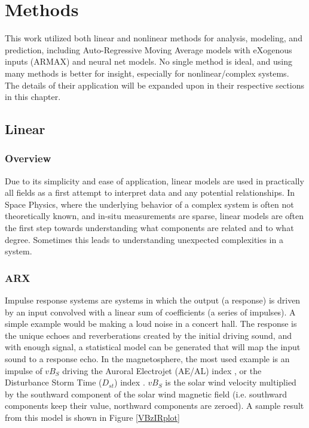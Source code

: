 \chapter[Models]{Methods}

This work utilized both linear and nonlinear methods for analysis, modeling, and prediction, including Auto-Regressive Moving Average models with eXogenous inputs (ARMAX) and neural net models. No single method is ideal, and using many methods is better for insight, especially for nonlinear/complex systems. The details of their application will be expanded upon in their respective sections in this chapter.

\section{Linear}

\subsection{Overview}
Due to its simplicity and ease of application, linear models are used in practically all fields as a first attempt to interpret data and any potential relationships. In Space Physics, where the underlying behavior of a complex system is often not theoretically known, and in-situ measurements are sparse, linear models are often the first step towards understanding what components are related and to what degree. Sometimes this leads to understanding unexpected complexities in a system.


\subsection{ARX}

Impulse response systems are systems in which the output (a response) is driven by an input convolved with a linear sum of coefficients (a series of impulses). A simple example would be making a loud noise in a concert hall. The response is the unique echoes and reverberations created by the initial driving sound, and with enough signal, a statistical model can be generated that will map the input sound to a response echo. In the magnetosphere, the most used example is an impulse of $vB_S$ driving the Auroral Electrojet (AE/AL) index \citep{VBzAL}, or the Disturbance Storm Time ($D_{st}$) index \citep{VBzDST}. $vB_S$ is the solar wind velocity multiplied by the southward component of the solar wind magnetic field (i.e. southward components keep their value, northward components are zeroed). A sample result from this model is  shown in Figure \ref{VBzIRplot}

